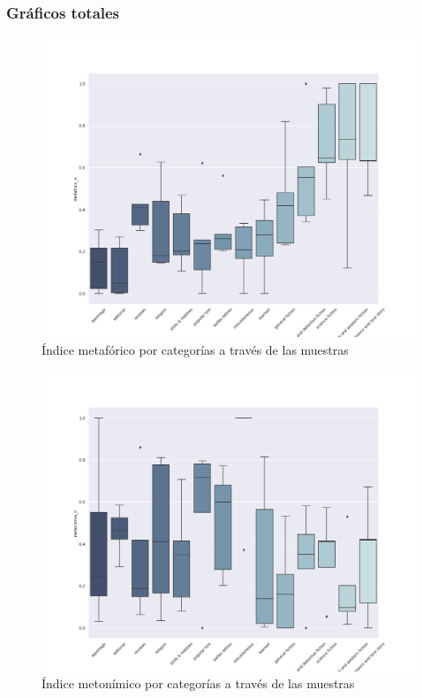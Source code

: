\documentclass[twoside]{article}
\begin{document}
\subsubsection{Gráficos totales}
\label{sec:org5199173}
\begin{figure}[!H]
\centering
\includegraphics[width=0.9\linewidth]{./resultados/graphs/total/accum_cat_metafora.png}
\caption{\label{fig:metafora_categorias} Índice metafórico por categorías a través de las muestras }
\end{figure}
\begin{figure}[!H]
\centering
\includegraphics[width=0.9\linewidth]{./resultados/graphs/total/accum_cat_metonimia.png}
\caption{\label{fig:metonimia_categorias} Índice metonímico por categorías a través de las muestras  }
\end{figure}
\end{document}
